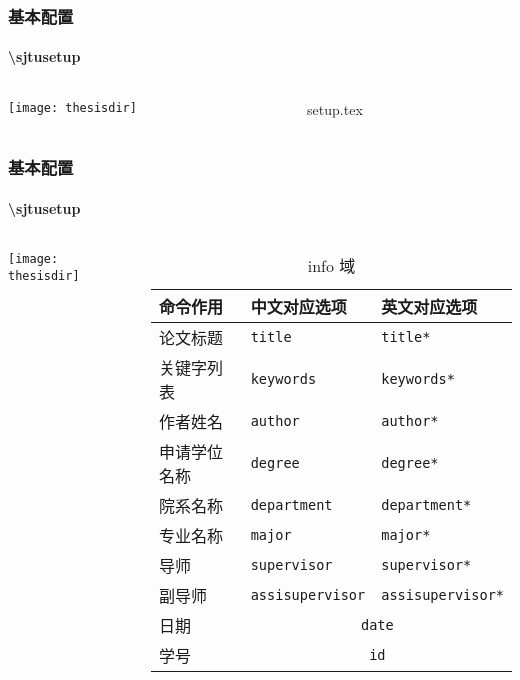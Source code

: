 \begin{frame}[fragile]
  \frametitle{基本配置}
  \framesubtitle{\textbackslash{}sjtusetup}
  \begin{columns}
    \begin{column}{0.45\textwidth}
      \texttt{[image: thesisdir]}
    \end{column}
    \begin{column}{0.55\textwidth}
      \begin{codeblock}[firstnumber=3]{setup.tex}
      \end{codeblock}
    \end{column}
  \end{columns}
\end{frame}

\begin{frame}
  \frametitle{基本配置}
  \framesubtitle{\textbackslash{}sjtusetup}
  \begin{columns}
    \begin{column}{0.45\textwidth}
      \texttt{[image: thesisdir]}
    \end{column}
    \begin{column}{0.55\textwidth}
      \begin{table}[H]
        \centering
        \caption{info 域}
        \footnotesize
        \begin{tabular}{lll} \toprule
          命令作用 & 中文对应选项 & 英文对应选项 \\ \midrule
          论文标题 & \texttt{title} & \texttt{title*} \\
          关键字列表 & \texttt{keywords} & \texttt{keywords*} \\
          作者姓名&  \texttt{author} &\texttt{author*}\\
          申请学位名称 & \texttt{degree}&\texttt{degree*}\\
          院系名称 & \texttt{department} & \texttt{department*}\\
          专业名称 & \texttt{major} & \texttt{major*}\\
          导师 & \texttt{supervisor} & \texttt{supervisor*}\\
          副导师 & \texttt{assisupervisor} & \texttt{assisupervisor*}\\
          日期 & \multicolumn{2}{c}{\texttt{date}}\\
          学号 & \multicolumn{2}{c}{\texttt{id}}\\ \bottomrule
          \end{tabular}
      \end{table}
    \end{column}
  \end{columns}
\end{frame}


